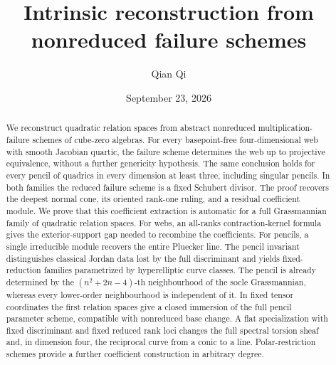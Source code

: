 \title[Intrinsic reconstruction from failure schemes]{Intrinsic reconstruction from nonreduced failure schemes}
\author{Qian Qi}
\date{September 23, 2026}
\begin{abstract}
We reconstruct quadratic relation spaces from abstract nonreduced
multiplication-failure schemes of cube-zero algebras.  For every
basepoint-free four-dimensional web with smooth Jacobian quartic,
the failure scheme determines the web up to projective equivalence,
without a further genericity hypothesis.  The same conclusion holds
for every pencil of quadrics in every dimension at least three,
including singular pencils.  In both families the reduced failure
scheme is a fixed Schubert divisor.  The proof recovers the deepest
normal cone, its oriented rank-one ruling, and a residual coefficient
module.  We prove that this coefficient extraction is automatic for
a full Grassmannian family of quadratic relation spaces.  For webs,
an all-ranks contraction-kernel formula gives the exterior-support
gap needed to recombine the coefficients.  For pencils, a single
irreducible module recovers the entire Pluecker line.  The pencil
invariant distinguishes classical Jordan data lost by the full
discriminant and yields fixed-reduction families parametrized by
hyperelliptic curve classes.  The pencil is already determined by the
\((n^2+2n-4)\)-th neighbourhood of the socle Grassmannian,
whereas every lower-order neighbourhood is independent of it.
In fixed tensor coordinates the first relation spaces give a
closed immersion of the full pencil parameter scheme, compatible
with nonreduced base change.  A flat specialization with fixed discriminant and fixed reduced rank loci
changes the full spectral torsion sheaf and, in dimension four, the
reciprocal curve from a conic to a line.  Polar-restriction schemes provide a
further coefficient construction in arbitrary degree.
\end{abstract}
\maketitle
